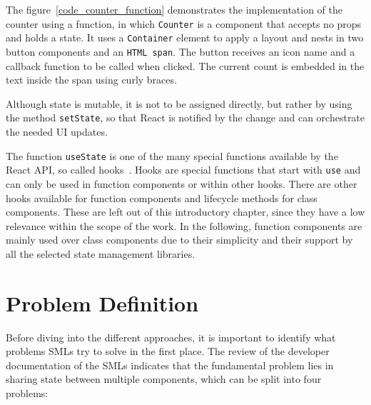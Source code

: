 The figure~\ref{code_counter_function} demonstrates the implementation of the counter using a
function, in which \texttt{Counter} is a component that accepts
no props and holds a state. It uses a \texttt{Container} element to
apply a layout and nests in two button components and an \texttt{HTML span}\cite{mozilla_span}.
The button receives an icon name and a callback function to
be called when clicked. The current count is embedded in the text inside
the span using curly braces.

Although state is mutable, it is not to be assigned directly, but rather
by using the method \texttt{setState}, so that React is notified by the
change and can orchestrate the needed UI updates\cite{react_state_and_lifecycle}.

The function \texttt{useState} is one of the many special functions
available by the React API, so called hooks~\cite{react_hooks}.
Hooks are special
functions that start with \texttt{use} and can only be used in function
components or within other hooks. There are other hooks available for
function components and lifecycle methods for class components. These
are left out of this introductory chapter, since they have a low
relevance within the scope of the work. In the following, function components are mainly
used over class components due to their simplicity and their support by
all the selected state management libraries.

\clearpage
\clearpage
\hypertarget{problem-definition}{
\section{Problem Definition}\label{problem-definition}}

Before diving into the different approaches, it is important to identify
what problems SMLs try to solve in the first place. The review of the
developer documentation of the SMLs indicates that the fundamental
problem lies in sharing state between multiple components, which can be
split into four problems:

